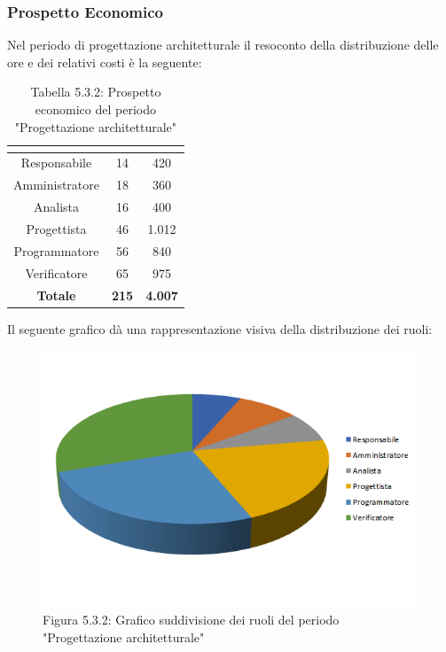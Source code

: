 \subsubsection{Prospetto Economico}
Nel periodo di progettazione architetturale il resoconto della distribuzione delle ore e dei relativi costi è la seguente:

\renewcommand{\arraystretch}{1.5}
\begin{table}[H]
\begin{center}
\begin{tabular}{|c|c|c|}
\hline
\rowcolor{title_row}
\textbf{\color{title_text}{Ruolo}}  & \textbf{\color{title_text}{Ore}} & \textbf{\color{title_text}{Costo in \euro}} \\ \hline
Responsabile    & 14              & 420                     \\ \hline
Amministratore  & 18              & 360                   \\ \hline
Analista        & 16              & 400                    \\ \hline
Progettista     & 46              & 1.012                     \\ \hline
Programmatore   & 56              & 840                     \\ \hline
Verificatore    & 65              & 975                    \\ \hline
\textbf{Totale} & \textbf{215}    & \textbf{4.007}         \\ \hline
\end{tabular}
\caption{Tabella 5.3.2: Prospetto economico del periodo "Progettazione architetturale"\label{}}
\end{center}
\end{table}
\renewcommand{\arraystretch}{1}

Il seguente grafico dà una rappresentazione visiva della distribuzione dei ruoli: \\
\begin{figure} [H]
	\centering
	\includegraphics[scale=1]{Res/ExcelGrafici/Grafici/ProgettazioneRuoli.png}
	\caption{Figura 5.3.2: Grafico suddivisione dei ruoli del periodo "Progettazione architetturale"}\label{}
\end{figure}

\pagebreak